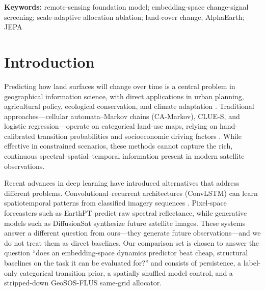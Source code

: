 \documentclass{article}
\newenvironment{keywords}{\par\noindent\textbf{Keywords:} }{\par}%
\begin{document}
\begin{abstract}
regimes $\times$ 15 seeds) confirms that GeoFM embeddings function as an auxiliary channel: engineered features retain 100\% of slope improvement, moderate dropout retains 87\%, and the embedding-only condition retains only 13\%. \textbf{R2 reproducibility note}: the R1 baseline (mean advantage $+0.0047$, 7/10 positive) used AlphaEarth embeddings that predated the initial repository commit and are no longer available; the R2 results reported here use freshly re-extracted embeddings (commit \texttt{9c2ba1d}) and R2-retrained checkpoints, all released as versioned artefacts. Five reviewer follow-up experiments (E2, E3, E4, E5, E6) are now completed, with E1 diagnosed and E7 deferred as optional. All per-area win/loss tables, paired-inference tests, embeddings, and model checkpoints are released as versioned artefacts.
\end{abstract}

\begin{keywords}
remote-sensing foundation model; embedding-space change-signal screening; scale-adaptive allocation ablation; land-cover change; AlphaEarth; JEPA
\end{keywords}

\section{Introduction}
\label{sec:intro}

Predicting how land surfaces will change over time is a central problem in geographical information science, with direct applications in urban planning, agricultural policy, ecological conservation, and climate adaptation \citep{verburg2004lulc}. Traditional approaches---cellular automata--Markov chains (CA-Markov), CLUE-S, and logistic regression---operate on categorical land-use maps, relying on hand-calibrated transition probabilities and socioeconomic driving factors \citep{veldkamp2004clues}. While effective in constrained scenarios, these methods cannot capture the rich, continuous spectral--spatial--temporal information present in modern satellite observations.

Recent advances in deep learning have introduced alternatives that address different problems. Convolutional--recurrent architectures (ConvLSTM) can learn spatiotemporal patterns from classified imagery sequences \citep{shi2015convlstm}. Pixel-space forecasters such as EarthPT \citep{smith2023earthpt} predict raw spectral reflectance, while generative models such as DiffusionSat \citep{khanna2023diffusionsat} synthesize future satellite images. These systems answer a different question from ours---they generate future observations---and we do not treat them as direct baselines. Our comparison set is chosen to answer the question ``does an embedding-space dynamics predictor beat cheap, structural baselines on the task it can be evaluated for?'' and consists of persistence, a label-only categorical transition prior, a spatially shuffled model control, and a stripped-down GeoSOS-FLUS same-grid allocator.
\end{document}
